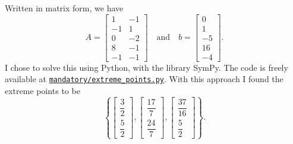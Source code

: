 \documentclass[
  a4paper,
  12pt,
]{article}
\numberwithin{equation}{section}
\begin{document}
\begin{solution}
  Written in matrix form, we have
  \begin{equation}
    A =
    \begin{bmatrix}
      1 & -1 \\
      -1 & 1 \\
      0 & -2 \\
      8 & -1 \\
      -1 & -1
    \end{bmatrix}
    \quad\text{and}\quad
    b =
    \begin{bmatrix}
      0 \\
      1 \\
      -5 \\
      16 \\
      -4
    \end{bmatrix}.
  \end{equation}
  I chose to solve this using Python, with the library SymPy.
  The code is freely available at \href{https://github.com/augustfe/MAT4120/blob/main/mandatory/extreme_points.py}{\texttt{mandatory/extreme\_points.py}}.
  With this approach I found the extreme points to be
  \begin{equation}
    \left\{
      \begin{bmatrix} \dfrac{3}{2} \\ \dfrac{5}{2}
      \end{bmatrix},
      \begin{bmatrix} \dfrac{17}{7} \\ \dfrac{24}{7}
      \end{bmatrix},
      \begin{bmatrix} \dfrac{37}{16} \\ \dfrac{5}{2}
      \end{bmatrix}
    \right\}.
  \end{equation}
\end{solution}
\end{document}
